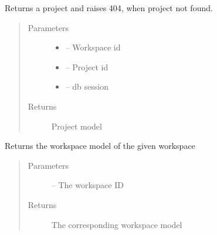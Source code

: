 \documentclass[letterpaper,10pt,english]{sphinxmanual}
\begin{document}

\begin{fulllineitems}
\label{_source/son_editor.impl:son_editor.impl.gitimpl.get_project}
Returns a project and raises 404, when project not found.
\begin{quote}\begin{description}
\item[{Parameters}] \leavevmode\begin{itemize}
\item {} 
 -- Workspace id

\item {} 
 -- Project id

\item {} 
 -- db session

\end{itemize}

\item[{Returns}] \leavevmode
Project model

\end{description}\end{quote}

\end{fulllineitems}


\begin{fulllineitems}
\label{_source/son_editor.impl:son_editor.impl.gitimpl.get_workspace}
Returns the workspace model of the given workspace
\begin{quote}\begin{description}
\item[{Parameters}] \leavevmode
{} -- The workspace ID

\item[{Returns}] \leavevmode
The corresponding workspace model

\end{description}\end{quote}

\end{fulllineitems}
\end{document}
